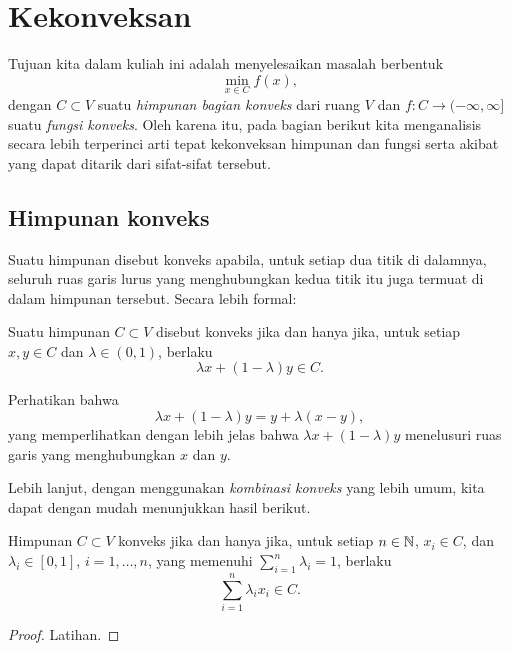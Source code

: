 \chapter{Kekonveksan}

Tujuan kita dalam kuliah ini adalah menyelesaikan masalah berbentuk
\begin{equation}
    \min_{x\in C} f(x),
\end{equation}
dengan $C\subset V$ suatu \emph{himpunan bagian konveks} dari ruang $V$ dan $f:C\rightarrow (-\infty,\infty]$ suatu \emph{fungsi konveks}. Oleh karena itu, pada bagian berikut kita menganalisis secara lebih terperinci arti tepat kekonveksan himpunan dan fungsi serta akibat yang dapat ditarik dari sifat-sifat tersebut.

\section{Himpunan konveks}
Suatu himpunan disebut konveks apabila, untuk setiap dua titik di dalamnya, seluruh ruas garis lurus yang menghubungkan kedua titik itu juga termuat di dalam himpunan tersebut. Secara lebih formal:
\begin{defn}
    Suatu himpunan $C\subset V$ disebut konveks jika dan hanya jika, untuk setiap $x,y\in C$ dan $\lambda\in (0,1)$, berlaku
    \begin{equation}
        \lambda x + (1-\lambda) y\in C.
    \end{equation}
\end{defn}

Perhatikan bahwa
\begin{equation}
    \lambda x + (1-\lambda) y = y + \lambda(x-y),
\end{equation}
yang memperlihatkan dengan lebih jelas bahwa $\lambda x + (1-\lambda)y$ menelusuri ruas garis yang menghubungkan $x$ dan $y$.

Lebih lanjut, dengan menggunakan \emph{kombinasi konveks} yang lebih umum, kita dapat dengan mudah menunjukkan hasil berikut.

\begin{lemma}
    Himpunan $C\subset V$ konveks jika dan hanya jika, untuk setiap $n\in \mathbb{N}$, $x_i\in C$, dan $\lambda_i\in [0,1]$, $i=1,\dots,n$, yang memenuhi $\sum_{i=1}^n\lambda_i=1$, berlaku
    \begin{equation}
        \sum_{i=1}^n\lambda_i x_i \in C.
    \end{equation}
\end{lemma}
\begin{proof}
    Latihan.
\end{proof}

